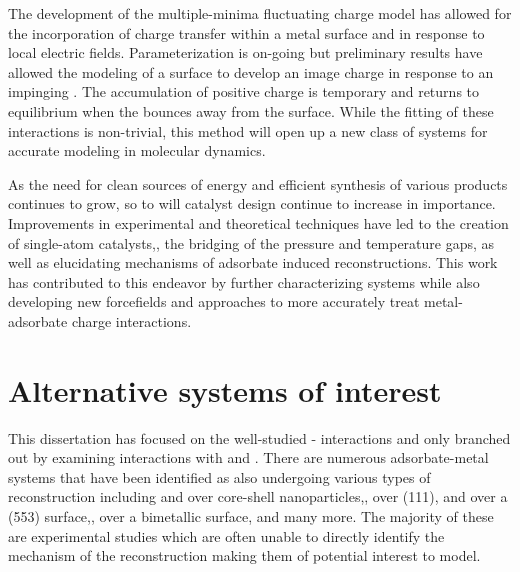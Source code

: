 %
The development of the multiple-minima fluctuating charge model has allowed for
the incorporation of charge transfer within a metal surface and in response to
local electric fields. Parameterization is on-going but preliminary results
have allowed the modeling of a  surface to develop an image charge in
response to an impinging . The accumulation of positive charge is
temporary and returns to equilibrium when the  bounces away from the
surface. While the fitting of these interactions is non-trivial, this method
will open up a new class of systems for accurate modeling in molecular
dynamics.

As the need for clean sources of energy and efficient synthesis of various
products continues to grow, so to will catalyst design continue to increase in
importance.  Improvements in experimental and theoretical techniques have led
to the creation of single-atom catalysts,\citep{Qiao:2011zp, Yang:2013sf}, the
bridging of the pressure and temperature gaps,\citep{Tao:2010aa, Eren:2016qt}
as well as elucidating mechanisms of adsorbate induced
reconstructions.\citep{Michalka:2013aa,Kim:2016cr} This work has contributed to
this endeavor by further characterizing  systems while also
developing new forcefields and approaches to more accurately treat
metal-adsorbate charge interactions.



\section{Alternative systems of interest}
This dissertation has focused on the well-studied - interactions
and only branched out by examining  interactions with  and
.  There are numerous adsorbate-metal systems that have been identified
as also undergoing various types of reconstruction including  and
 over  core-shell nanoparticles,\citep{Tao:2008aa},
 over  (111),\citep{Eren:2016qt}  and  over a (553)
 surface,\citep{Zhang:2015zr},  over a  bimetallic
surface,\citep{Kim:2013mi} and many more. The majority of these are experimental
studies which are often unable to directly identify the mechanism of the
reconstruction making them of potential interest to model.

